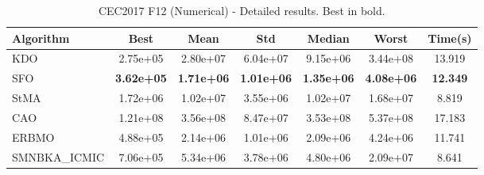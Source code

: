 \begin{table}[H]
\centering\small
\caption{CEC2017 F12 (Numerical) - Detailed results. Best in bold.}
\label{tab:cec2017_F12}
\begin{tabular}{lcccccc}
\toprule
\textbf{Algorithm} & \textbf{Best} & \textbf{Mean} & \textbf{Std} & \textbf{Median} & \textbf{Worst} & \textbf{Time(s)} \\
\midrule
KDO & 2.75e+05 & 2.80e+07 & 6.04e+07 & 9.15e+06 & 3.44e+08 & 13.919 \\
SFO & \textbf{3.62e+05} & \textbf{1.71e+06} & \textbf{1.01e+06} & \textbf{1.35e+06} & \textbf{4.08e+06} & \textbf{12.349} \\
StMA & 1.72e+06 & 1.02e+07 & 3.55e+06 & 1.02e+07 & 1.68e+07 & 8.819 \\
CAO & 1.21e+08 & 3.56e+08 & 8.47e+07 & 3.53e+08 & 5.37e+08 & 17.183 \\
ERBMO & 4.88e+05 & 2.14e+06 & 1.01e+06 & 2.09e+06 & 4.24e+06 & 11.741 \\
SMNBKA_ICMIC & 7.06e+05 & 5.34e+06 & 3.78e+06 & 4.80e+06 & 2.09e+07 & 8.641 \\
\bottomrule
\end{tabular}
\end{table}
